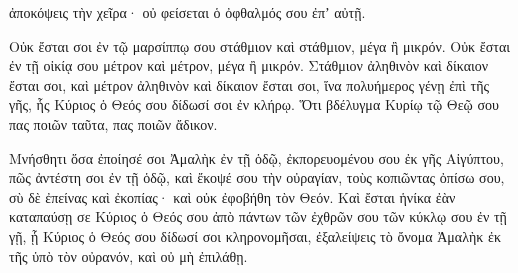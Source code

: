 {ἀποκόψεις τὴν χεῖρα· οὐ φείσεται ὁ ὀφθαλμός σου ἐπʼ αὐτῇ.
\par }{\PP {}Οὐκ ἔσται σοι ἐν τῷ μαρσίππῳ σου στάθμιον καὶ στάθμιον, μέγα ἢ μικρόν.
Οὐκ ἔσται ἐν τῇ οἰκίᾳ σου μέτρον καὶ μέτρον, μέγα ἢ μικρόν.
Στάθμιον ἀληθινὸν καὶ δίκαιον ἔσται σοι, καὶ μέτρον ἀληθινὸν καὶ δίκαιον ἔσται σοι, ἵνα πολυήμερος γένῃ ἐπὶ τῆς γῆς, ἧς Κύριος ὁ Θεός σου δίδωσί σοι ἐν κλήρῳ.
Ὅτι βδέλυγμα Κυρίῳ τῷ Θεῷ σου πας ποιῶν ταῦτα, πας ποιῶν ἄδικον.
\par }{\PP {}Μνήσθητι ὅσα ἐποίησέ σοι Ἀμαλὴκ ἐν τῇ ὁδῷ, ἐκπορευομένου σου ἐκ γῆς Αἰγύπτου,
πῶς ἀντέστη σοι ἐν τῇ ὁδῷ, καὶ ἔκοψέ σου τὴν οὐραγίαν, τοὺς κοπιῶντας ὀπίσω σου, σὺ δὲ ἐπείνας καὶ ἐκοπίας· καὶ οὐκ ἐφοβήθη τὸν Θεόν.
Καὶ ἔσται ἡνίκα ἐὰν καταπαύσῃ σε Κύριος ὁ Θεός σου ἀπὸ πάντων τῶν ἐχθρῶν σου τῶν κύκλῳ σου ἐν τῇ γῇ, ᾗ Κύριος ὁ Θεός σου δίδωσί σοι κληρονομῆσαι, ἐξαλείψεις τὸ ὄνομα Ἀμαλὴκ ἐκ τῆς ὑπὸ τὸν οὐρανόν, καὶ οὐ μὴ ἐπιλάθῃ.

}
